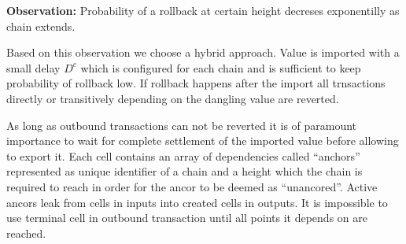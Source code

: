 \textbf{Observation:} Probability of a rollback at certain height decreses exponentilly as chain extends.

Based on this observation we choose a hybrid approach.
Value is imported with a small delay $D^c$ which is configured for each chain and is sufficient to keep probability of rollback low.
If rollback happens after the import all trnsactions directly or transitively depending on the dangling value are reverted.

As long as outbound transactions can not be reverted it is of paramount importance to wait for complete settlement of the imported value before allowing to export it.
Each cell contains an array of dependencies called \enquote{anchors} represented as unique identifier of a chain and a height which the chain is required to reach in order for the ancor to be deemed as \enquote{unancored}.
Active ancors leak from cells in inputs into created cells in outputs.
It is impossible to use terminal cell in outbound transaction until all points it depends on are reached.
